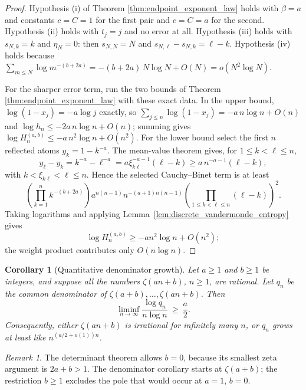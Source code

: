 \documentclass[preprint,12pt]{elsarticle}
\numberwithin{equation}{section}
\theoremstyle{plain}
\newtheorem{corollary}[theorem]{Corollary}
\theoremstyle{definition}
\theoremstyle{remark}
\newtheorem{remark}[theorem]{Remark}
\begin{document}
\begin{proof}
Hypothesis (i) of Theorem \ref{thm:endpoint_exponent_law} holds with $\beta=a$ and constants $c=C=1$ for the
first pair and $c=C=a$ for the second. Hypothesis (ii) holds with $t_{j}=j$ and no error at all.
Hypothesis (iii) holds with \(s_{N,k}=k\) and \(\eta_N=0\): then \(s_{N,N}=N\) and
\(s_{N,\ell}-s_{N,k}=\ell-k\). Hypothesis (iv) holds because
$\sum_{m\le N}\log m^{-(b+2a)}=-(b+2a)\,N\log N+O(N)=o(N^{2}\log N)$.

For the sharper error term, run the two bounds of Theorem \ref{thm:endpoint_exponent_law} with these exact data.
In the upper bound, $\log(1-x_{j})=-a\log j$ exactly, so
$\sum_{j\le n}\log(1-x_{j})=-a\,n\log n+O(n)$ and $\log h_{n}\le-2a\,n\log n+O(n)$; summing gives
$\log H_{n}^{(a,b)}\le-a\,n^{2}\log n+O(n^{2})$. For the lower bound select the first \(n\) reflected atoms
\(y_k=1-k^{-a}\).  The mean-value theorem gives, for \(1\le k<\ell\le n\),
\[
y_\ell-y_k
=k^{-a}-\ell^{-a}
=a\xi_{k\ell}^{-a-1}(\ell-k)
\ge a\,n^{-a-1}(\ell-k),
\]
with \(k<\xi_{k\ell}<\ell\le n\).  Hence the selected Cauchy--Binet term is at least
\[
\left(\prod_{k=1}^n k^{-(b+2a)}\right)
a^{n(n-1)}
n^{-(a+1)n(n-1)}
\left(\prod_{1\le k<\ell\le n}(\ell-k)\right)^2.
\]
Taking logarithms and applying Lemma~\ref{lem:discrete_vandermonde_entropy} gives
\[
\log H_n^{(a,b)}
\ge -a n^2\log n+O(n^2);
\]
the weight product contributes only \(O(n\log n)\).
\end{proof}


\begin{corollary}[Quantitative denominator growth]
\label{cor:diophantine}
Let \(a\ge1\) and \(b\ge1\) be integers, and suppose all the numbers
\(\zeta(an+b)\), \(n\ge1\), are rational.
Let $q_{n}$ be the common denominator of $\zeta(a+b),\dots,\zeta(an+b)$. Then
\begin{equation}
\liminf_{n\to\infty}\frac{\log q_{n}}{n\log n}\ \ge\ \frac a2 .
\end{equation}
Consequently, either $\zeta(an+b)$ is irrational for infinitely many $n$, or $q_{n}$ grows at least
like $n^{(a/2+o(1))n}$. 
\end{corollary}

\begin{remark}
The determinant theorem allows \(b=0\), because its smallest zeta argument is \(2a+b>1\).
The denominator corollary starts at \(\zeta(a+b)\); the restriction \(b\ge1\) excludes the
pole that would occur at \(a=1\), \(b=0\).
\end{remark}
\end{document}
